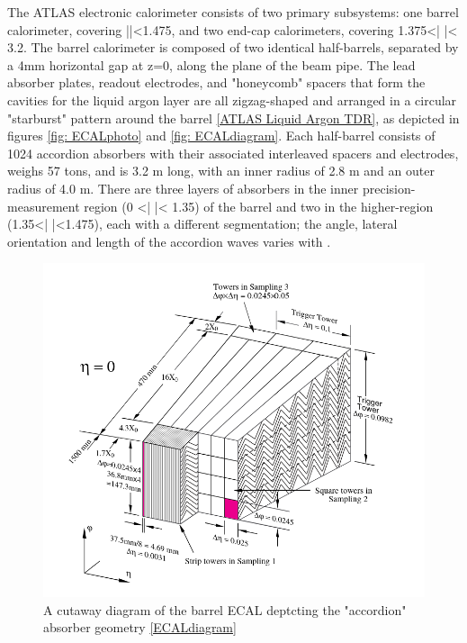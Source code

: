 The ATLAS electronic calorimeter consists of two primary subsystems: one barrel calorimeter, covering |\eta |<1.475, and two end-cap calorimeters, covering 1.375<| \eta |< 3.2. The barrel calorimeter is composed of two identical half-barrels, separated by a 4mm horizontal gap at z=0, along the plane of the beam pipe. The lead absorber plates, readout electrodes, and "honeycomb" spacers that form the cavities for the liquid argon layer are all zigzag-shaped and arranged in a circular "starburst" pattern around the barrel \ref{ATLAS Liquid Argon TDR}, as depicted in figures \ref{fig: ECALphoto} and \ref{fig: ECALdiagram}. Each half-barrel consists of 1024 accordion absorbers with their associated interleaved spacers and electrodes, weighs 57 tons, and is 3.2 m long, with an inner radius of 2.8 m and an outer radius of 4.0 m. There are three layers of absorbers in the inner precision-measurement region (0 <| \eta |< 1.35) of the barrel and two in the higher-\eta region (1.35<| \eta |<1.475), each with a different segmentation; the angle, lateral orientation and length of the accordion waves varies with \eta.

\begin{figure}
  \includegraphics[width=\linewidth]{figures/detector_chapter/ECALdiagram.png}
  \caption{A cutaway diagram of the barrel ECAL deptcting the "accordion" absorber geometry \ref{ECALdiagram}}
  \label{fig:ECALdiagram}
\end{figure}

